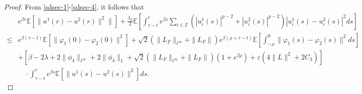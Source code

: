 \documentclass[11pt]{article}
\numberwithin{equation}{section}
\theoremstyle{plain}
\begin{document}
\begin{proof}
 From \eqref{sdsec-1}-\eqref{sdsec-4}, it follows that
 \begin{align}\label{sdsec-5}
 	   & e^{\beta r} \mathbb{E}
 	            \left[ \| u^1(r) - u^2(r) \|^2 \| \right]
 	       + \frac{\lambda_2}{2} \mathbb{E}
                 	\left[ \int_{\tau-t}^{r} e^{\beta s}
                 	             \sum_{ i \in \mathbb{Z}} 
         	                            \left( |u_{i}^1(s)|^{p-2} + |u_{i}^2(s)|^{p-2} \right)    
         	                            |u_{i}^1(s) - u_{i}^2(s)|^2
         	                  ds
 	                \right]  \nonumber\\
 \le & e^{\beta (\tau-t)} \mathbb{E} \left[ \|  \varphi_1
 (0)  - \varphi_2 (0)  \|^2 \right]
            + \sqrt{2}( \|L_{F}\|_{\ell^\infty}+ \|L_{F}\| ) 
               e^{ \beta(\rho+\tau-t)}
                     \mathbb{E}
                             \left[ \int_{-\rho}^{0} \| \varphi_1(s) - \varphi_2(s) \|^2 ds
                            \right]  \nonumber\\
        & + \left[ \beta - 2\lambda + 2\|\phi_{4}\|_{\ell^\infty} + 2\|\phi_{4}\|_1
 	                     + \sqrt{2}( \|L_{F}\|_{\ell^\infty} + \|L_{F}\| )
 	                         (1+e^{\beta \rho} )
 	                     + \varepsilon
 	                              \left( 4 \| L \|^2 + 2 C_3
 	                              \right)   
 	            \right]  \nonumber\\
 	    & \quad  
 	            \cdot \int_{\tau-t}^{r} e^{\beta s} 
 	                          \mathbb{E} 
                                     \left[ \|u^1(s) - u^2(s) \|^2 \right] ds.
 \end{align}
 

\end{proof}
\end{document}
